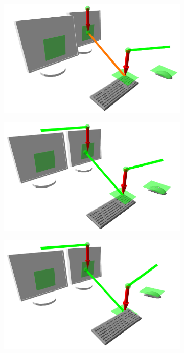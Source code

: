 \begin{figure}
\begin{center}
\begin{subfigure}[b]{.3\textwidth}
  \end{subfigure}
  \begin{subfigure}[b]{.3\textwidth}
    \includegraphics[width=1\linewidth]{bilder/paper_fotos/s6.png}
  \end{subfigure}
  \begin{subfigure}[b]{.3\textwidth}
    \includegraphics[width=1\linewidth]{bilder/paper_fotos/s8.png}
  \end{subfigure}
  \begin{subfigure}[b]{.3\textwidth}
    \includegraphics[width=1\linewidth]{bilder/paper_fotos/s9.png}

\end{subfigure}
\end{center}
\end{figure}

